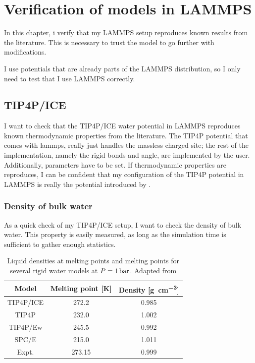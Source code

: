\chapter{Verification of models in LAMMPS}
In this chapter, i verify that my LAMMPS setup reproduces known results from the literature. This is necessary to trust the model to go further with modifications.

I use potentials that are already parts of the LAMMPS distribution, so I only need to test that I use LAMMPS correctly. 

\section{TIP4P/ICE}
I want to check that the TIP4P/ICE water potential in LAMMPS reproduces known thermodynamic properties from the literature. The TIP4P potential that comes with lammps, really just handles the massless charged site; the rest of the implementation, namely the rigid bonds and angle, are implemented by the user. Additionally, parameters have to be set. If thermodynamic properties are reproduces, I can be confident that my configuration of the TIP4P potential in LAMMPS is really the potential introduced by \cite{Abascal2005}. 

\subsection{Density of bulk water}
As a quick check of my TIP4P/ICE setup, I want to check the density of bulk water. This property is easily measured, as long as the simulation time is sufficient to gather enough statistics. 

\begin{table}
\centering
\caption{Liquid densities at melting points and melting points for several rigid water models at $P = \text{\SI{1}{\bar}}$. Adapted from \cite{Abascal2005}}
\begin{tabular}{c|cc}
Model & Melting point [K] & Density [\si{\gram\per\cubic\cm}] \\
\hline
TIP4P/ICE 	& 272.2 	& 0.985 \\
TIP4P 		& 232.0 	& 1.002 \\
TIP4P/Ew 	& 245.5 	& 0.992 \\
SPC/E 		& 215.0 	& 1.011 \\
Expt. 		& 273.15 	& 0.999
\end{tabular}
\end{table}

